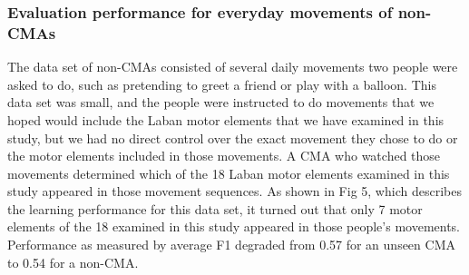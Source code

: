 \subsubsection{Evaluation performance for everyday movements of non-CMAs}
The data set of non-CMAs consisted of several daily movements two people were
asked to do, such as pretending to greet a friend or play with a balloon. This
data set was small, and the people were instructed to do movements that we hoped
would include the Laban motor elements that we have examined in this study, but
we had no direct control over the exact movement they chose to do or the motor
elements included in those movements. A CMA who watched those movements
determined which of the 18 Laban motor elements examined in this study appeared
in those movement sequences. As shown in Fig 5, which describes the learning
performance for this data set, it turned out that only 7 motor elements of the
18 examined in this study appeared in those people's movements. Performance as
measured by average F1 degraded from 0.57 for an unseen CMA to 0.54 for a
non-CMA.


